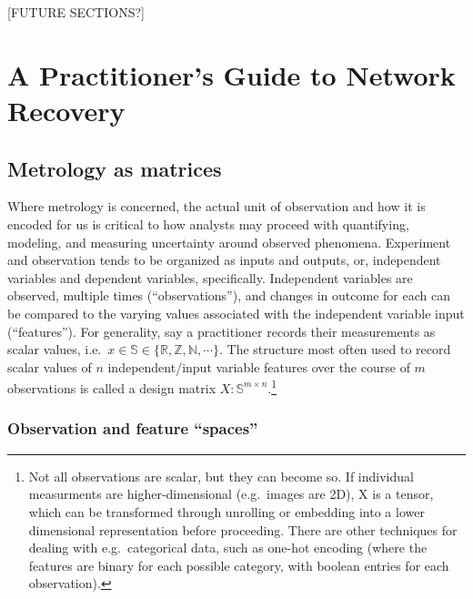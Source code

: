 \documentclass[%
	12pt,
		oneside,
		letterpaper
]{book}
\begin{document}
{[}FUTURE SECTIONS?{]}

\part{A Practitioner's Guide to Network Recovery}

\chapter{Metrology as matrices}\label{metrology-as-matrices}

Where metrology is concerned, the actual unit of observation and how it
is encoded for us is critical to how analysts may proceed with
quantifying, modeling, and measuring uncertainty around observed
phenomena. Experiment and observation tends to be organized as inputs
and outputs, or, independent variables and dependent variables,
specifically. Independent variables are observed, multiple times
(``observations''), and changes in outcome for each can be compared to
the varying values associated with the independent variable input
(``features''). For generality, say a practitioner records their
measurements as scalar values,
i.e.~\(x\in\mathbb{S}\in\{\mathbb{R,Z,N},\cdots\}\). The structure most
often used to record scalar values of \(n\) independent/input variable
features over the course of \(m\) observations is called a design matrix
\(X:\mathbb{S}^{m\times n}\).\footnote{ Not all observations are scalar,
  but they can become so. If individual measurments are
  higher-dimensional (e.g.~images are 2D), X is a tensor, which can be
  transformed through unrolling or embedding into a lower dimensional
  representation before proceeding. There are other techniques for
  dealing with e.g.~categorical data, such as one-hot encoding (where
  the features are binary for each possible category, with boolean
  entries for each observation).}

\section{Observation and feature
``spaces''}\label{observation-and-feature-spaces}
\end{document}
